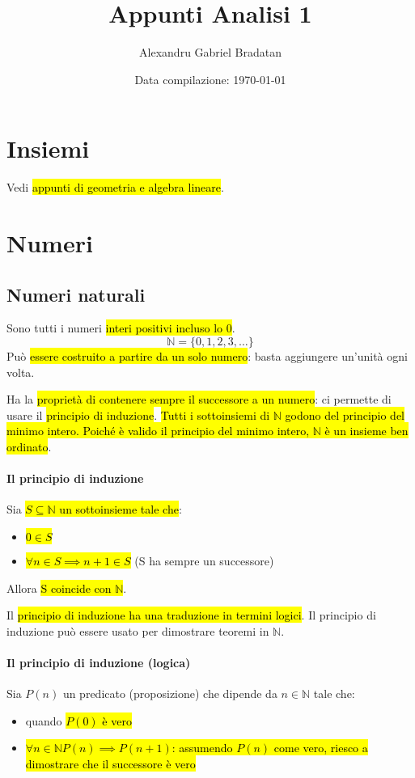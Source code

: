 \documentclass[a4paper,12pt,oneside]{article}
\title{Appunti Analisi 1}
\author{Alexandru Gabriel Bradatan}
\date{Data compilazione: \today}
\begin{document}
\maketitle
\tableofcontents

\section{Insiemi}
Vedi \hl{appunti di geometria e algebra lineare}.

\section{Numeri}
\subsection{Numeri naturali}
Sono tutti i numeri \hl{interi positivi incluso lo 0}.
\[
    \mathbb{N} = \{0, 1, 2, 3, \dots \}
\]
Può \hl{essere costruito a partire da un solo numero}: basta aggiungere un'unità
ogni volta.

Ha la \hl{proprietà di contenere sempre il successore a un numero}: ci
permette di usare il \hl{principio di induzione}. \hl{Tutti i sottoinsiemi di 
$\mathbb{N}$ godono del principio del minimo intero. Poiché è valido il 
principio del minimo intero, $\mathbb{N}$ è un insieme ben ordinato}.

\paragraph{Il principio di induzione} Sia \hl{$S \subseteq \mathbb{N}$ un 
sottoinsieme tale che}:
\begin{itemize}
    \item \hl{$0 \in S$}
    \item \hl{$\forall n \in S \implies n+1 \in S$} (S ha sempre un successore)
\end{itemize}

Allora \hl{S coincide con $\mathbb{N}$}.

Il \hl{principio di induzione ha una traduzione in termini logici}. Il
principio di induzione può essere usato per dimostrare teoremi in $\mathbb{N}$.

\paragraph{Il principio di induzione (logica)} Sia $P(n)$ un predicato 
(proposizione) che dipende da $n \in \mathbb{N}$ tale che:
\begin{itemize}
    \item quando \hl{$P(0)$ è vero}
    \item \hl{$\forall n \in \mathbb{N} P(n) \implies P(n+1)$: assumendo $P(n)$ come
        vero, riesco a dimostrare che il successore è vero}
\end{itemize}
\end{document}
